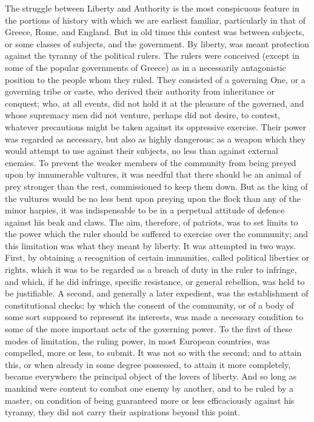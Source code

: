 \documentclass[12pt]{report}
\begin{document}
The struggle between Liberty and Authority is the most conspicuous feature in the portions of history with which we are earliest familiar, particularly in that of Greece, Rome, and England. But in old times this contest was between subjects, or some classes of subjects, and the government. By liberty, was meant protection against the tyranny of the political rulers. The rulers were conceived (except in some of the popular governments of Greece) as in a necessarily antagonistic position to the people whom they ruled. They consisted of a governing One, or a governing tribe or caste, who derived their authority from inheritance or conquest; who, at all events, did not hold it at the pleasure of the governed, and whose supremacy men did not venture, perhaps did not desire, to contest, whatever precautions might be taken against its oppressive exercise. Their power was regarded as necessary, but also as highly dangerous; as a weapon which they would attempt to use against their subjects, no less than against external enemies. To prevent the weaker members of the community from being preyed upon by innumerable vultures, it was needful that there should be an animal of prey stronger than the rest, commissioned to keep them down. But as the king of the vultures would be no less bent upon preying upon the flock than any of the minor harpies, it was indispensable to be in a perpetual attitude of defence against his beak and claws. The aim, therefore, of patriots, was to set limits to the power which the ruler should be suffered to exercise over the community; and this limitation was what they meant by liberty. It was attempted in two ways. First, by obtaining a recognition of certain immunities, called political liberties or rights, which it was to be regarded as a breach of duty in the ruler to infringe, and which, if he did infringe, specific resistance, or general rebellion, was held to be justifiable. A second, and generally a later expedient, was the establishment of constitutional checks; by which the consent of the community, or of a body of some sort supposed to represent its interests, was made a necessary condition to some of the more important acts of the governing power. To the first of these modes of limitation, the ruling power, in most European countries, was compelled, more or less, to submit. It was not so with the second; and to attain this, or when already in some degree possessed, to attain it more completely, became everywhere the principal object of the lovers of liberty. And so long as mankind were content to combat one enemy by another, and to be ruled by a master, on condition of being guaranteed more or less efficaciously against his tyranny, they did not carry their aspirations beyond this point.
\end{document}
